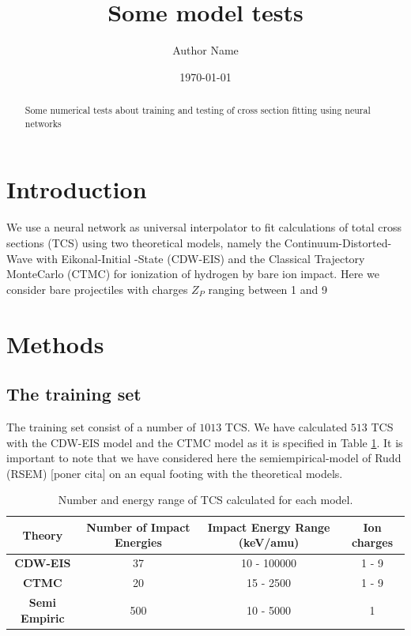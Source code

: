 \documentclass[aps, preprint]{revtex4-2}
\begin{document}
\title{Some model tests}

\author{Author Name}

\date{\today}

\begin{abstract}
Some numerical tests about training and testing of cross section fitting 
using neural networks
\end{abstract}

\maketitle

\section{Introduction}
\label{sec:intro}

We use a neural network as universal interpolator to 
fit calculations of total cross sections (TCS) using two theoretical 
models, namely the Continuum-Distorted-Wave with Eikonal-Initial
-State (CDW-EIS) and the Classical Trajectory MonteCarlo (CTMC)
for ionization of hydrogen by bare ion impact. Here we consider
bare projectiles with charges $Z_P$ ranging between 1 and 9 

\section{Methods}
\label{sec:methods}

\subsection{The training set}
The training set consist of a number of $1013$ TCS. We have 
calculated $ 513 $ TCS with the CDW-EIS model and the CTMC model 
as it is specified in Table \ref{Table-TS}. It is important to 
note that we have considered here the semiempirical-model of Rudd 
(RSEM) [poner cita] on an equal footing with the theoretical models.

\begin{table}[h!]
\centering
\begin{tabular}{|c|c|c|c|}
\hline
\textbf{Theory} & Number of Impact Energies & 
Impact Energy Range (keV/amu) & Ion charges\\ \hline
\textbf{CDW-EIS} & 37 & 10 - 100000 & 1 - 9\\ \hline
\textbf{CTMC} & 20 & 15 - 2500 & 1 - 9\\ \hline
\textbf{Semi Empiric} & 500 & 10 - 5000 & 1\\ \hline

\end{tabular}
\caption{Number and energy range of TCS calculated for each model.}
\label{Table-TS}
\end{table}
\end{document}
